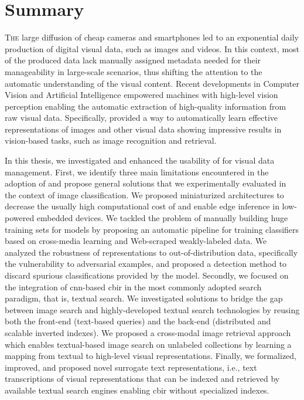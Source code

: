 \chapter*{Summary}
\lettrine{T}{he} large diffusion of cheap cameras and smartphones led to an exponential daily production of digital visual data, such as images and videos.
In this context, most of the produced data lack manually assigned metadata needed for their manageability in large-scale scenarios, thus shifting the attention to the automatic understanding of the visual content.
Recent developments in Computer Vision and Artificial Intelligence empowered machines with high-level vision perception enabling the automatic extraction of high-quality information from raw visual data.
Specifically,  provided a way to automatically learn effective representations of images and other visual data showing impressive results in vision-based tasks, such as image recognition and retrieval.

In this thesis, we investigated and enhanced the usability of  for visual data management.
First, we identify three main limitations encountered in the adoption of  and propose general solutions that we experimentally evaluated in the context of image classification.
We proposed miniaturized architectures to decrease the usually high computational cost of  and enable edge inference in low-powered embedded devices.
We tackled the problem of manually building huge training sets for models by proposing an automatic pipeline for training classifiers based on cross-media learning and Web-scraped weakly-labeled data.
We analyzed the robustness of  representations to out-of-distribution data, specifically the vulnerability to adversarial examples, and proposed a detection method to discard spurious classifications provided by the model.
%
Secondly, we focused on the integration of \acrshort{cnn}-based \acrfull{cbir} in the most commonly adopted search paradigm, that is, textual search.
We investigated solutions to bridge the gap between image search and highly-developed textual search technologies by reusing both the front-end (text-based queries) and the back-end (distributed and scalable inverted indexes). %
We proposed a cross-modal image retrieval approach which enables textual-based image search on unlabeled collections by learning a mapping from textual to high-level visual representations.
Finally, we formalized, improved, and proposed novel surrogate text representations, i.e., text transcriptions of visual representations that can be indexed and retrieved by available textual search engines enabling \acrshort{cbir} without specialized indexes.
